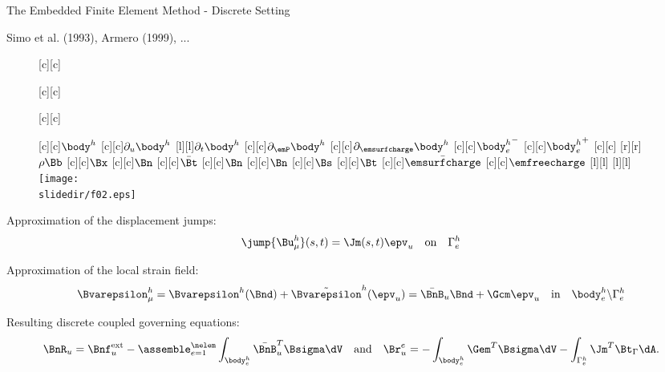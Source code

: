 
\begin{frame}{The Embedded Finite Element Method - Discrete Setting}

\begin{reference}{}{}
Simo et al. (1993), Armero (1999), ...
\end{reference}


\vspace*{-3mm}

\begin{figure}
\centering
{\footnotesize
  [c][c]{\parbox{3cm}{}}
  [c][c]{\parbox{3cm}{}}
  [c][c]{\parbox{3cm}{}}
  [c][c]{$\body^h$}
  [c][c]{$\partial_u\body^h$}
  [l][l]{$\partial_t\body^h$}
  [c][c]{$\partial_\emP\body^h$}
  [c][c]{$\partial_\emsurfcharge\body^h$}
  [c][c]{${\body_e^h}^-$}
  [c][c]{${\body_e^h}^+$}
  [c][c]{}
  [r][r]{$\rho\Bb$}
  [c][c]{$\Bx$}
  [c][c]{$\Bn$}
  [c][c]{$\bar\Bt$}
  [c][c]{$\Bn$}
  [c][c]{$\Bn$}
  [c][c]{$\Bs$}
  [c][c]{$\Bt$}
  [c][c]{$\bar\emsurfcharge$}
  [c][c]{$\emfreecharge$}
  [l][l]{}
  [l][l]{}
\texttt{[image: \\slidedir/f02.eps]}
}
\end{figure}

\bigskip

Approximation of the displacement jumps:
\begin{equation*}
\jump{\Bu_\mu^h}(s,t)=\Jm(s,t)\epv_u\quad\text{on}\quad\Gamma_e^h
\end{equation*}

\smallskip

Approximation of the local strain field:
\begin{equation*}
\Bvarepsilon_\mu^h=\Bvarepsilon^h(\Bnd)+\tilde\Bvarepsilon^h(\epv_u)=\bar\BnB_u\Bnd+\Gcm\epv_u\quad\text{in}\quad\body_e^h\backslash\Gamma_e^h
\end{equation*}

\smallskip

Resulting discrete coupled governing equations:
\begin{equation*}
\BnR_u=\Bnf^{\text{ext}}_u-\assemble_{e=1}^{\nelem}\int_{\body_e^h}\bar\BnB^T_u\Bsigma\dV\quad\text{and}\quad
\Br^e_u=-\int_{\body_e^h}\Gem^T\Bsigma\dV-\int_{\Gamma_e^h}\Jm^T\Bt_\Gamma\dA.
\end{equation*}

\smallskip


\end{frame}
